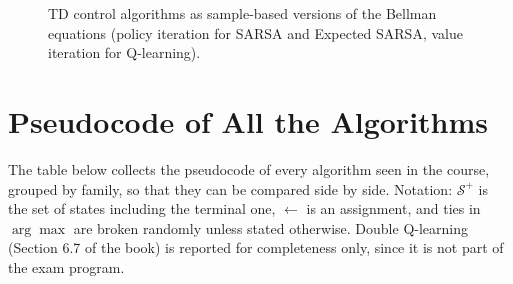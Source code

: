 \begin{figure}[H]
\centering
{}
\caption{TD control algorithms as sample-based versions of the Bellman equations (policy iteration for SARSA and Expected SARSA, value iteration for Q-learning).}
\label{fig:td-control-bellman}
\end{figure}

\section{Pseudocode of All the Algorithms}
\label{sec:all-pseudocode}

The table below collects the pseudocode of every algorithm seen in the course, grouped by family, so that they can be compared side by side. Notation: $\mathcal{S}^+$ is the set of states including the terminal one, $\leftarrow$ is an assignment, and ties in $\arg\max$ are broken randomly unless stated otherwise. Double Q-learning (Section 6.7 of the book) is reported for completeness only, since it is not part of the exam program.

\newcommand{\Ii}{\hspace*{1.2em}}
\newcommand{\Iii}{\hspace*{2.4em}}
\newcommand{\Iiii}{\hspace*{3.6em}}
\newcommand{\pc}[1]{\begin{minipage}[t]{\linewidth}\raggedright #1\par\vspace{3pt}\end{minipage}}
\newcommand{\algfam}[1]{\multicolumn{2}{@{}l@{}}{\cellcolor{blue!8}\rule{0pt}{2.6ex}\textbf{#1}}\\*\midrule}
\newcommand{\algname}[2]{\pc{\textbf{#1}\\[2pt]\textit{#2}}}

